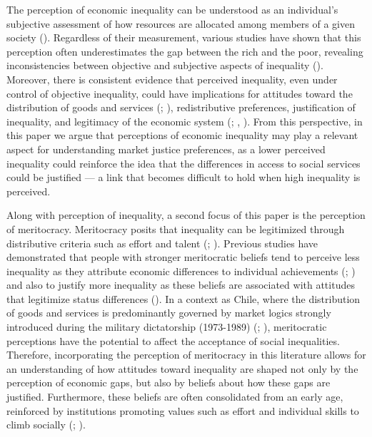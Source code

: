 \documentclass[
  12pt,
]{article}
\begin{document}
The perception of economic inequality can be understood as an
individual's subjective assessment of how resources are allocated among
members of a given society (). Regardless of their measurement, various studies have shown that
this perception often underestimates the gap between the rich and the
poor, revealing inconsistencies between objective and subjective aspects
of inequality (). Moreover,
there is consistent evidence that perceived inequality, even under
control of objective inequality, could have implications for attitudes
toward the distribution of goods and services
(;
), redistributive
preferences, justification of inequality, and legitimacy of the economic
system (;
, ). From this
perspective, in this paper we argue that perceptions of economic
inequality may play a relevant aspect for understanding market justice
preferences, as a lower perceived inequality could reinforce the idea
that the differences in access to social services could be justified ---
a link that becomes difficult to hold when high inequality is perceived.

Along with perception of inequality, a second focus of this paper is the
perception of meritocracy. Meritocracy posits that inequality can be
legitimized through distributive criteria such as effort and talent
(;
). Previous studies have
demonstrated that people with stronger meritocratic beliefs tend to
perceive less inequality as they attribute economic differences to
individual achievements (;
) and also to justify more
inequality as these beliefs are associated with attitudes that
legitimize status differences
(). In a context
as Chile, where the distribution of goods and services is predominantly
governed by market logics strongly introduced during the military
dictatorship (1973-1989) (; ),
meritocratic perceptions have the potential to affect the acceptance of
social inequalities. Therefore, incorporating the perception of
meritocracy in this literature allows for an understanding of how
attitudes toward inequality are shaped not only by the perception of
economic gaps, but also by beliefs about how these gaps are justified.
Furthermore, these beliefs are often consolidated from an early age,
reinforced by institutions promoting values such as effort and
individual skills to climb socially
(;
).
\end{document}
